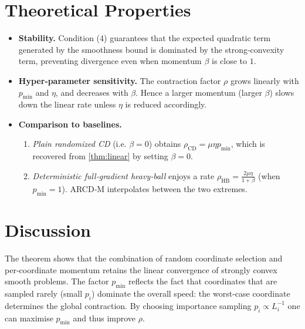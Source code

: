 \documentclass{article}
\begin{document}
\section*{Theoretical Properties}
\begin{itemize}
    \item \textbf{Stability.} Condition (4) guarantees that the expected quadratic term generated by the smoothness bound is dominated by the strong‑convexity term, preventing divergence even when momentum $\beta$ is close to $1$.
    \item \textbf{Hyper‑parameter sensitivity.} The contraction factor $\rho$ grows linearly with $p_{\min}$ and $\eta$, and decreases with $\beta$. Hence a larger momentum (larger $\beta$) slows down the linear rate unless $\eta$ is reduced accordingly.
    \item \textbf{Comparison to baselines.}
        \begin{enumerate}[label=(\alph*)]
            \item \emph{Plain randomized CD} (i.e. $\beta=0$) obtains $\rho_{\text{CD}}=\mu\eta p_{\min}$, which is recovered from \eqref{thm:linear} by setting $\beta=0$.
            \item \emph{Deterministic full‑gradient heavy‑ball} enjoys a rate $\rho_{\text{HB}}=\frac{2\mu\eta}{1+\beta}$ (when $p_{\min}=1$). ARCD‑M interpolates between the two extremes.
        \end{enumerate}
\end{itemize}

\section*{Discussion}
The theorem shows that the combination of random coordinate selection and per‑coordinate momentum retains the linear convergence of strongly convex smooth problems. The factor $p_{\min}$ reflects the fact that coordinates that are sampled rarely (small $p_i$) dominate the overall speed: the worst‑case coordinate determines the global contraction. By choosing importance sampling $p_i\propto L_i^{-1}$ one can maximise $p_{\min}$ and thus improve $\rho$.
\end{document}
